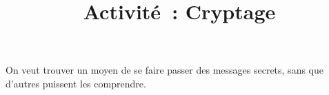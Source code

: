 \documentclass[a4paper]{article}
\title{Activité : Cryptage}
\date{}
\begin{document}
\maketitle

On veut trouver un moyen de se faire passer des messages secrets, sans que d'autres puissent les comprendre.

\begin{greybox}[frametitle={Consignes}]

\end{greybox}

\begin{question}

\end{question}
\end{document}
